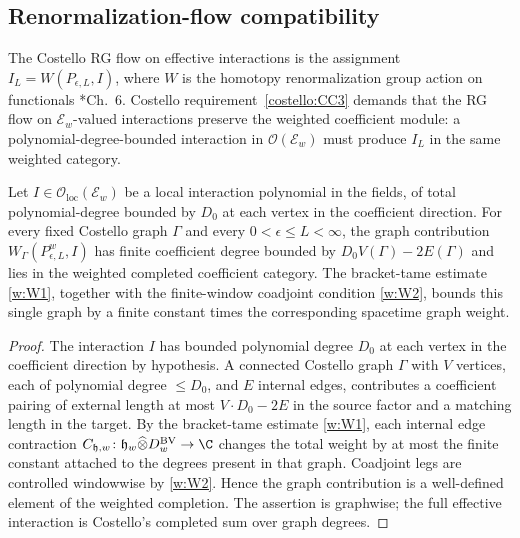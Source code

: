 \subsection*{Renormalization-flow compatibility}

The Costello RG flow on effective interactions is the assignment
$I_L=W(P_{\epsilon,L},I)$, where $W$ is the homotopy renormalization
group action on functionals \cite{costello-renormalization}*{Ch.~6}.
Costello requirement~\ref{costello:CC3} demands that the RG flow on
$\mathcal E_w$-valued interactions preserve the weighted coefficient
module: a polynomial-degree-bounded interaction in
$\mathcal O(\mathcal E_w)$ must produce $I_L$ in the same weighted
category.

\begin{prop}\label{prop:wt-rg-tame}
  Let $I\in\mathcal O_{\mathrm{loc}}(\mathcal E_w)$ be a local
  interaction polynomial in the fields, of total polynomial-degree
  bounded by $D_0$ at each vertex in the coefficient direction.  For
  every fixed Costello graph $\Gamma$ and every
  $0<\epsilon\leq L<\infty$, the graph contribution
  $W_\Gamma(P_{\epsilon,L}^{w},I)$ has finite coefficient degree
  bounded by $D_0V(\Gamma)-2E(\Gamma)$ and lies in the weighted
  completed coefficient category.  The bracket-tame estimate
  \ref{w:W1}, together with the finite-window coadjoint condition
  \ref{w:W2}, bounds this single graph by a finite constant times the
  corresponding spacetime graph weight.
\end{prop}

\begin{proof}
  The interaction $I$ has bounded polynomial degree $D_0$ at each
  vertex in the coefficient direction by hypothesis. A connected Costello graph
  $\Gamma$ with $V$ vertices, each of polynomial degree $\leq D_0$,
  and $E$ internal edges, contributes a coefficient
  pairing of external length at most $V\cdot D_0-2E$ in the source
  factor and a matching length in the target. By the bracket-tame
  estimate \ref{w:W1}, each internal edge contraction
  $C_{\mathfrak h,w}\colon
  \mathfrak h_w\widehat\otimes D^{\mathrm{BV}}_w\to\C$
  changes the total weight by at most the finite constant attached to
  the degrees present in that graph.  Coadjoint legs are controlled
  windowwise by \ref{w:W2}.  Hence the graph contribution is a
  well-defined element of the weighted completion.  The assertion is
  graphwise; the full effective interaction is Costello's completed sum
  over graph degrees.
\end{proof}

